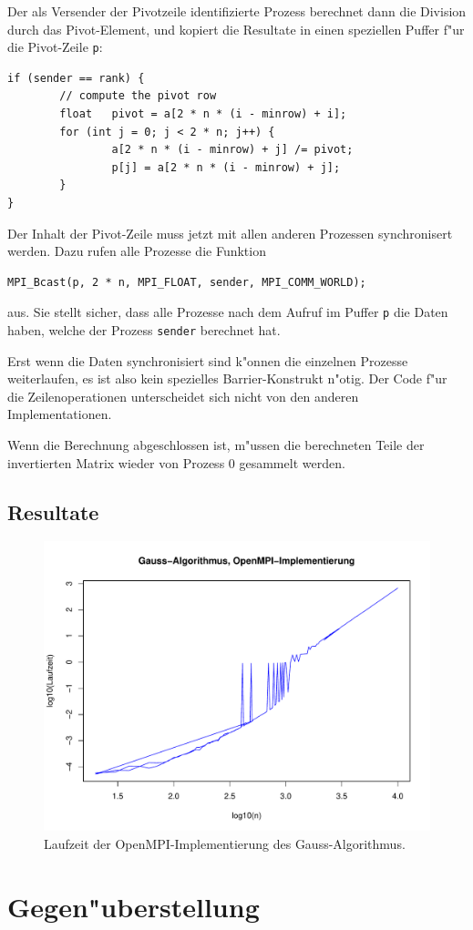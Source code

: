 Der als Versender der Pivotzeile identifizierte Prozess berechnet
dann die Division durch das Pivot-Element, und kopiert die Resultate
in einen speziellen Puffer f"ur die Pivot-Zeile \verb+p+:
\begin{verbatim}
if (sender == rank) {
        // compute the pivot row
        float   pivot = a[2 * n * (i - minrow) + i];
        for (int j = 0; j < 2 * n; j++) {
                a[2 * n * (i - minrow) + j] /= pivot;
                p[j] = a[2 * n * (i - minrow) + j];
        }
}
\end{verbatim}
Der Inhalt der Pivot-Zeile muss jetzt mit allen anderen Prozessen
synchronisert werden.
Dazu rufen alle Prozesse die Funktion
\begin{verbatim}
MPI_Bcast(p, 2 * n, MPI_FLOAT, sender, MPI_COMM_WORLD);
\end{verbatim}
aus. Sie stellt sicher, dass alle Prozesse nach dem Aufruf im Puffer \verb+p+
die Daten haben, welche der Prozess \verb+sender+ berechnet hat.

Erst wenn die Daten synchronisiert sind k"onnen die einzelnen Prozesse
weiterlaufen, es ist also kein spezielles Barrier-Konstrukt n"otig.
Der Code f"ur die Zeilenoperationen unterscheidet sich nicht von den
anderen Implementationen.

Wenn die Berechnung abgeschlossen ist, m"ussen die berechneten Teile
der invertierten Matrix wieder von Prozess 0 gesammelt werden.

\subsection{Resultate}
\begin{figure}
\begin{center}
\includegraphics[width=\hsize]{images/gauss-openmpi.pdf}
\end{center}
\caption{Laufzeit der OpenMPI-Implementierung des Gauss-Algorithmus.
\label{openmpi-performance}}
\end{figure}



\section{Gegen"uberstellung}


